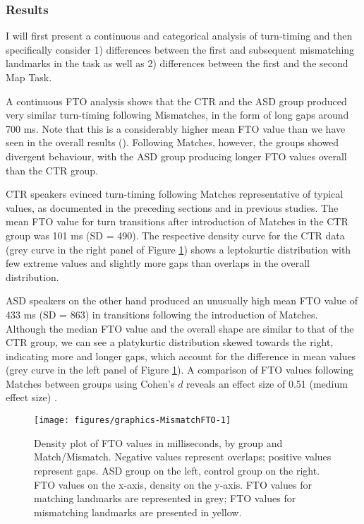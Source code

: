 \subsubsection{Results}\label{turntaking_results_mismatches_results}



I will first present a continuous and categorical analysis of turn-timing and then specifically consider 1) differences between the first and subsequent mismatching landmarks in the task as well as 2) differences between the first and the second Map Task.

\label{turntaking_results_mismatches_results_continuous}

A continuous FTO analysis shows that the CTR and the ASD group produced very similar turn-timing following Mismatches, in the form of long gaps around 700 ms. Note that this is a considerably higher mean FTO value than we have seen in the overall results (). Following Matches, however, the groups showed divergent behaviour, with the ASD group producing longer FTO values overall than the CTR group.

CTR speakers evinced turn-timing following Matches representative of typical values, as documented in the preceding sections and in previous studies. The mean FTO value for turn transitions after introduction of Matches in the CTR group was 101 ms (SD = 490). The respective density curve for the CTR data (grey curve in the right panel of Figure \ref{fig:MismatchFTO}) shows a leptokurtic distribution with few extreme values and slightly more gaps than overlaps in the overall distribution.

ASD speakers on the other hand produced an unusually high mean FTO value of 433 ms (SD = 863) in transitions following the introduction of Matches. Although the median FTO value and the overall shape are similar to that of the CTR group, we can see a platykurtic distribution skewed towards the right, indicating more and longer gaps, which account for the difference in mean values (grey curve in the left panel of Figure \ref{fig:MismatchFTO}). A comparison of FTO values following Matches between groups using Cohen's \(d\) reveals an effect size of 0.51 (medium effect size) \citep{cohenStatisticalPowerAnalysis1988,sawilowskyNewEffectSize2009}.



\begin{figure}

{\centering \texttt{[image: figures/graphics-MismatchFTO-1]} 
	
}

\caption{Density plot of FTO values in milliseconds, by group and Match/Mismatch. Negative values represent overlaps; positive values represent gaps. ASD group on the left, control group on the right. FTO values on the x-axis, density on the y-axis. FTO values for matching landmarks are represented in grey; FTO values for mismatching landmarks are presented in yellow.}\label{fig:MismatchFTO}
\end{figure}

